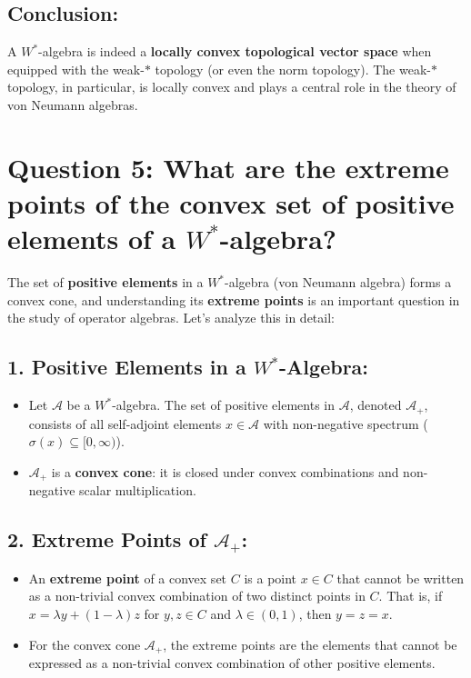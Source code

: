 \documentclass{article}
\begin{document}
\subsection*{Conclusion:}
A \( W^* \)-algebra is indeed a \textbf{locally convex topological vector space} when equipped with the weak-\( * \) topology (or even the norm topology). The weak-\( * \) topology, in particular, is locally convex and plays a central role in the theory of von Neumann algebras.

\section*{Question 5: What are the extreme points of the convex set of positive elements of a \( W^* \)-algebra?}

The set of \textbf{positive elements} in a \( W^* \)-algebra (von Neumann algebra) forms a convex cone, and understanding its \textbf{extreme points} is an important question in the study of operator algebras. Let's analyze this in detail:

\subsection*{1. Positive Elements in a \( W^* \)-Algebra:}
\begin{itemize}
    \item Let \( \mathcal{A} \) be a \( W^* \)-algebra. The set of positive elements in \( \mathcal{A} \), denoted \( \mathcal{A}_+ \), consists of all self-adjoint elements \( x \in \mathcal{A} \) with non-negative spectrum (\( \sigma(x) \subseteq [0, \infty) \)).
    \item \( \mathcal{A}_+ \) is a \textbf{convex cone}: it is closed under convex combinations and non-negative scalar multiplication.
\end{itemize}

\subsection*{2. Extreme Points of \( \mathcal{A}_+ \):}
\begin{itemize}
    \item An \textbf{extreme point} of a convex set \( C \) is a point \( x \in C \) that cannot be written as a non-trivial convex combination of two distinct points in \( C \). That is, if \( x = \lambda y + (1 - \lambda) z \) for \( y, z \in C \) and \( \lambda \in (0, 1) \), then \( y = z = x \).
    \item For the convex cone \( \mathcal{A}_+ \), the extreme points are the elements that cannot be expressed as a non-trivial convex combination of other positive elements.
\end{itemize}
\end{document}

